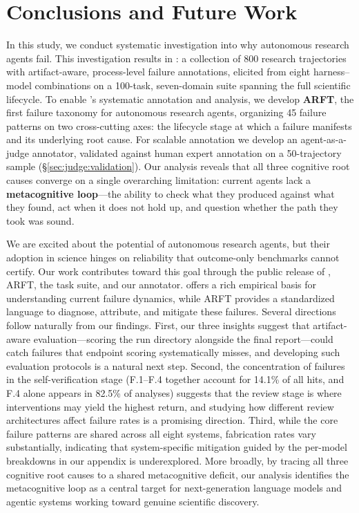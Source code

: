 \section{Conclusions and Future Work}

In this study, we conduct systematic investigation into why autonomous
research agents fail. This investigation results in \textbf{\bench}: a
collection of 800 research trajectories with artifact-aware, process-level
failure annotations, elicited from eight harness--model combinations on a
100-task, seven-domain suite spanning the full scientific lifecycle. To enable
\bench's systematic annotation and analysis, we develop \textbf{ARFT},
the first %
failure taxonomy for autonomous research agents, organizing 45
failure patterns on two cross-cutting axes: the lifecycle stage at which a
failure manifests and its underlying root cause. For scalable annotation we
develop an agent-as-a-judge annotator, validated against human expert annotation on a 50-trajectory sample (\S\ref{sec:judge:validation}). Our analysis reveals that all three cognitive root causes converge on a single
overarching limitation: current agents lack a \textbf{metacognitive
loop}---the ability to check what they produced against what they found, act
when it does not hold up, and question whether the path they took was sound.

We are excited about the potential of autonomous research agents, but their
adoption in science hinges on reliability that outcome-only benchmarks cannot
certify. Our work contributes toward this goal through the public release of
\bench, ARFT, the task suite, and our annotator. \bench offers a
rich empirical basis for understanding current failure dynamics, while ARFT
provides a standardized language to diagnose, attribute, and mitigate these
failures. Several directions follow naturally from our findings. First, our
three insights suggest that artifact-aware evaluation---scoring the run
directory alongside the final report---could catch failures that endpoint
scoring systematically misses, and developing such evaluation protocols is a
natural next step. Second, the concentration of failures in the
self-verification stage (F.1--F.4 together account for 14.1\% of all hits, and F.4 alone appears in 82.5\% of analyses) suggests that the review stage is where interventions may yield the
highest return, and studying how different review architectures affect failure
rates is a promising direction. Third, while the core failure patterns are
shared across all eight systems, fabrication rates vary substantially,
indicating that system-specific mitigation guided by the per-model breakdowns
in our appendix is underexplored. More broadly, by tracing
all three cognitive root causes to a shared metacognitive deficit, our
analysis identifies the metacognitive loop as a central target for next-generation language models and agentic systems working toward genuine scientific discovery.
